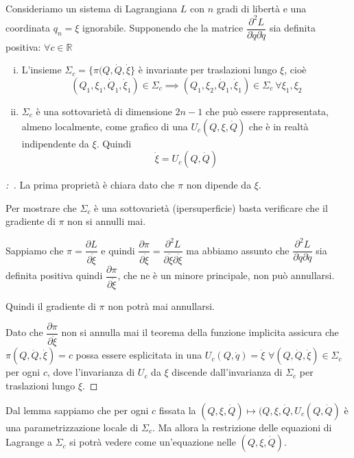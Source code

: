 \documentclass[11pt,a4paper,twoside]{book}
\newenvironment{lemma}[1][\empty]{\begin{Lemma}{
\ifx\empty#1\relax\else\mdseries\itshape#1\\\fi
}{}}{\end{Lemma}}
\newenvironment{dimo}[1][\proofname]{
	\begin{tcolorbox}[
	breakable, 
	enhanced, 
	interior hidden, 
	frame hidden, 
	borderline west = {1pt}{0pt}{gray}, 
	top=0pt, bottom=0pt, left=0pt]
\begin{proof}[#1:~]
}
{
\end{proof}
\end{tcolorbox}
}
\theoremstyle{esss}
\theoremstyle{dotless}
\numberwithin{equation}{section} %
\begin{document}
\begin{lemma}\label{lemmaPerRouth}
Consideriamo un sistema di Lagrangiana $L$ con $n$ gradi di libertà e una coordinata $q_n=\xi$ ignorabile. 
Supponendo che la matrice $\dfrac{\partial^2 L}{\partial \dot{q}\partial\dot{q}}$ sia definita positiva: $\forall c\in\mathbb{R}$\begin{enumerate}[i.]
\item L'insieme $\Sigma_c=\{\pi(Q,\dot{Q},\dot{\xi}\}$ è invariante per traslazioni lungo $\xi$, cioè \[
(Q_1,\xi_1,\dot{Q}_1,\dot{\xi}_1)\in\Sigma_c\implies(Q_1,\xi_2,\dot{Q}_1,\dot{\xi}_1)\in\Sigma_c \> \forall \xi_1,\xi_2
\]
\item $\Sigma_c$ è una sottovarietà di dimensione $2n-1$ che può essere rappresentata, almeno localmente, come grafico  di una $U_c(Q,\xi,\dot{Q})$ che è in realtà indipendente da $\xi$. Quindi \[
\dot{\xi}=U_c(Q,\dot{Q})
\]
\end{enumerate}
\end{lemma}
\begin{dimo}
La prima proprietà è chiara dato che $\pi$ non dipende da $\xi$.

Per mostrare che $\Sigma_c$ è una sottovarietà (ipersuperficie) basta verificare che il gradiente di $\pi$ non si annulli mai.

Sappiamo che $\pi=\dfrac{\partial L}{\partial \dot{\xi}}$ e quindi $\dfrac{\partial \pi}{\partial \dot{\xi}}=\dfrac{\partial^2 L}{\partial \dot{\xi}\partial\dot{\xi}}$ ma abbiamo assunto che $\dfrac{\partial^2 L}{\partial\dot{q}\partial\dot{q}}$ sia definita positiva quindi $\dfrac{\partial \pi}{\partial \dot{\xi}}$, che ne è un minore principale, non può annullarsi.

Quindi il gradiente di $\pi$ non potrà mai annullarsi.

Dato che $\dfrac{\partial \pi}{\partial \dot{\xi}}$ non si annulla mai il teorema della funzione implicita assicura che $\pi(Q,\dot{Q},\dot{\xi})=c$ possa essere esplicitata in una $U_c(Q,\dot{q})=\dot{\xi}$ $\forall (Q,\dot{Q},\dot{\xi})\in\Sigma_c$ per ogni $c$, dove l'invarianza di $U_c$ da $\xi$ discende dall'invarianza di $\Sigma_c$ per traslazioni lungo $\xi$.\qedhere
\end{dimo}


Dal lemma sappiamo che per ogni $c$ fissata la $(Q,\xi,\dot{Q})\mapsto(Q,\xi,\dot{Q},U_c(Q,\dot{Q})$ è una parametrizzazione locale di $\Sigma_c$.
Ma allora la restrizione delle equazioni di Lagrange a $\Sigma_c$ si potrà vedere come un'equazione nelle $(Q,\xi,\dot{Q})$.
\end{document}

